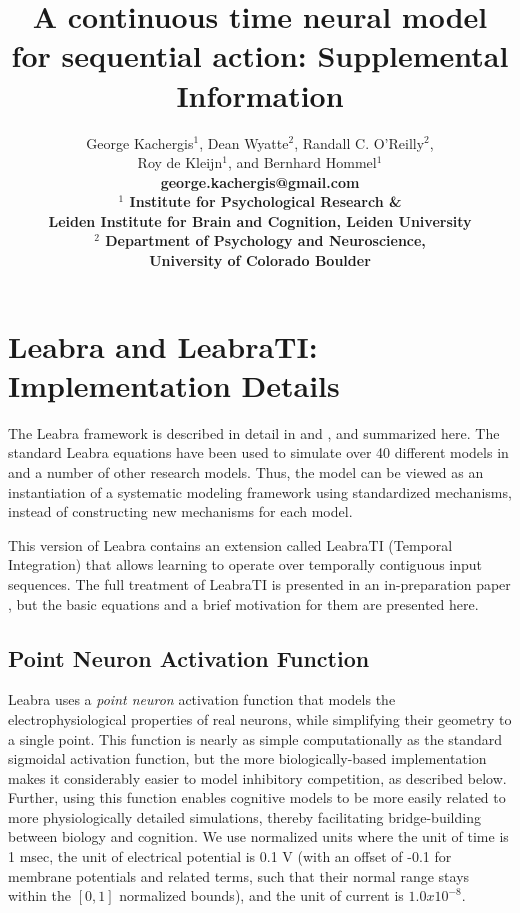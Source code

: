 \documentclass[10pt,letterpaper]{article}
\title{A continuous time neural model for sequential action: Supplemental Information}
\author{George Kachergis$^1$, Dean Wyatte$^2$, Randall C. O'Reilly$^2$, \\
	Roy de Kleijn$^1$, and Bernhard Hommel$^1$ \\
	\bf george.kachergis@gmail.com \\
	$^1$ Institute for Psychological Research \& \\
	Leiden Institute for Brain and Cognition, Leiden University \\
	$^2$ Department of Psychology and Neuroscience, \\
	University of Colorado Boulder }
\date{}
\numberwithin{equation}{section}
\begin{document}
\maketitle



\sloppy


\section{Leabra and LeabraTI: Implementation Details}

The Leabra framework is described in detail in  and
, and summarized here. The standard Leabra equations have been used to simulate over 40 different models in
 and a number of other research models. Thus, the
model can be viewed as an instantiation of a systematic modeling framework
using standardized mechanisms, instead of constructing new mechanisms for each
model.

This version of Leabra contains an extension called LeabraTI (Temporal Integration) that allows learning to operate over temporally contiguous input sequences. 
The full treatment of LeabraTI is presented in an in-preparation paper \cite{OReilly:LeabraTI}, but the basic equations and a brief motivation for them are
presented here.

\subsection{Point Neuron Activation Function} 

Leabra uses a {\em point neuron} activation function that models the
electrophysiological properties of real neurons, while simplifying their
geometry to a single point. This function is nearly as simple computationally
as the standard sigmoidal activation function, but the more biologically-based
implementation makes it considerably easier to model inhibitory competition,
as described below. Further, using this function enables cognitive models to
be more easily related to more physiologically detailed simulations, thereby
facilitating bridge-building between biology and cognition. We use normalized
units where the unit of time is 1 msec, the unit of electrical potential is
0.1 V (with an offset of -0.1 for membrane potentials and related terms, such
that their normal range stays within the $[0, 1]$ normalized bounds), and the unit
of current is $1.0x10^{-8}$.
\end{document}
